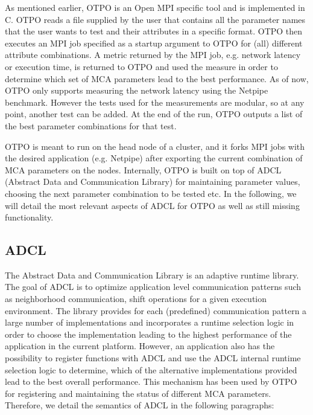 As mentioned earlier, OTPO is an Open MPI specific tool and is implemented in C. OTPO reads a file supplied by the
user that contains all the parameter names that the user wants to test and their attributes in a specific format. OTPO then executes an MPI job specified as a startup argument to OTPO for (all) different attribute combinations. A metric returned by the MPI job, e.g. network latency or execution time, is returned to OTPO and used the measure in order to determine which set of MCA parameters lead to the best performance. As of now, OTPO only supports measuring the network latency using the Netpipe\cite{netpipe} benchmark. However the tests used for the measurements are modular, so at any point, another test can be added. At the end of the run, OTPO outputs a list of the best parameter combinations for that test.

OTPO is meant to run on the head node of a cluster, and it forks MPI jobs with the desired application (e.g. Netpipe) after exporting the current combination of MCA parameters on the nodes. Internally, OTPO is built on top of ADCL \cite{ADCL} (Abstract Data and Communication Library) for maintaining parameter values, choosing the next parameter combination to be tested etc. In the following, we will detail the most relevant aspects of ADCL for OTPO as well as still missing functionality.

\subsection{ADCL}
The Abstract Data and Communication Library is an adaptive runtime library. The goal of ADCL is to optimize application level communication patterns such as neighborhood communication, shift operations for a given execution environment. The library provides for each (predefined) communication pattern a large number of implementations and incorporates a runtime selection logic in order to choose the implementation leading to the highest performance of the application in the current platform. However, an application also has the possibility to register functions with ADCL and use the ADCL internal runtime selection logic to determine, which of the alternative implementations provided lead to the best overall performance. This mechanism has been used by OTPO for registering and maintaining the status of different MCA parameters. Therefore, we detail the semantics of ADCL in the following paragraphs:

